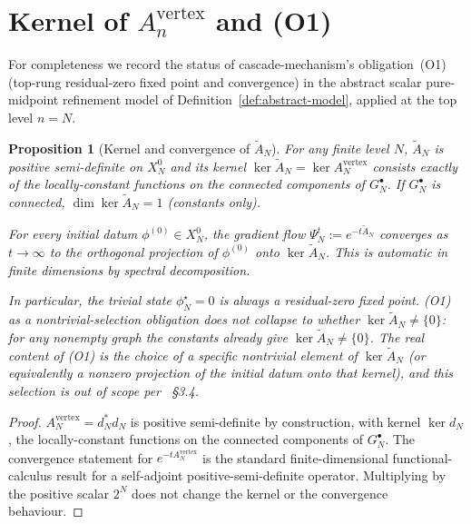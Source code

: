 \documentclass[11pt]{article}
\theoremstyle{plain}
\newtheorem{proposition}[theorem]{Proposition}
\theoremstyle{definition}
\theoremstyle{remark}
\begin{document}
\section{Kernel of $A_n^{\mathrm{vertex}}$ and (O1)}\label{sec:O1}

For completeness we record the status of cascade-mechanism's
obligation~(O1) (top-rung residual-zero fixed point and convergence)
in the abstract scalar pure-midpoint refinement model of
Definition~\ref{def:abstract-model}, applied at the top level
$n = N$.

\begin{proposition}[Kernel and convergence of $\widetilde A_N$]\label{prop:O1-status}
For any finite level $N$, $\widetilde A_N$ is positive semi-definite
on $X_N^{0}$ and its kernel
$\ker \widetilde A_N = \ker A_N^{\mathrm{vertex}}$ consists exactly of
the locally-constant functions on the connected components of
$G_N^{\bullet}$. If $G_N^{\bullet}$ is connected,
$\dim \ker \widetilde A_N = 1$ (constants only).

For every initial datum $\phi^{(0)} \in X_N^{0}$, the gradient flow
$\Psi^{t}_N := e^{-t \widetilde A_N}$ converges as $t \to \infty$ to
the orthogonal projection of $\phi^{(0)}$ onto
$\ker \widetilde A_N$. This is automatic in finite dimensions by
spectral decomposition.

In particular, the trivial state $\phi^{\star}_N = 0$ is always a
residual-zero fixed point. (O1) as a \emph{nontrivial}-selection
obligation does not collapse to whether
$\ker \widetilde A_N \ne \{0\}$: for any nonempty graph the
constants already give $\ker \widetilde A_N \ne \{0\}$. The real
content of (O1) is the choice of a specific nontrivial element of
$\ker \widetilde A_N$ (or equivalently a nonzero projection of the
initial datum onto that kernel), and this selection is out of scope
per \cite{CascadeMechanism}~\S3.4.
\end{proposition}

\begin{proof}
$A_N^{\mathrm{vertex}} = d_N^{*} d_N$ is positive semi-definite by
construction, with kernel $\ker d_N$, the locally-constant
functions on the connected components of $G_N^{\bullet}$. The
convergence statement for $e^{-t A_N^{\mathrm{vertex}}}$ is the
standard finite-dimensional functional-calculus result for a
self-adjoint positive-semi-definite operator. Multiplying by the
positive scalar $2^N$ does not change the kernel or the convergence
behaviour.
\end{proof}
\end{document}

